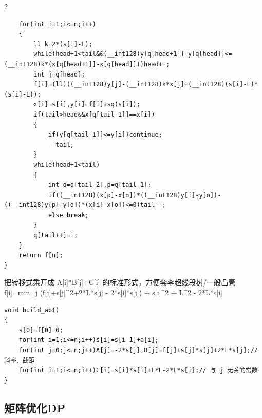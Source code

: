 \documentclass[UTF8,fontset=fandol,a4paper,twoside]{ctexart}
\newcommand{\note}[1]{{\fontsize{10}{12}\selectfont #1\par}}
\begin{document}
\begin{multicols}{2}
\begin{lstlisting}
    for(int i=1;i<=n;i++)
    {
        ll k=2*(s[i]-L);
        while(head+1<tail&&(__int128)y[q[head+1]]-y[q[head]]<=(__int128)k*(x[q[head+1]]-x[q[head]]))head++;
        int j=q[head];
        f[i]=(ll)((__int128)y[j]-(__int128)k*x[j]+(__int128)(s[i]-L)*(s[i]-L));
        x[i]=s[i],y[i]=f[i]+sq(s[i]);
        if(tail>head&&x[q[tail-1]]==x[i])
        {
            if(y[q[tail-1]]<=y[i])continue;
            --tail;
        }
        while(head+1<tail)
        {
            int o=q[tail-2],p=q[tail-1];
            if((__int128)(x[p]-x[o])*((__int128)y[i]-y[o])-((__int128)y[p]-y[o])*(x[i]-x[o])<=0)tail--;
            else break;
        }
        q[tail++]=i;
    }
    return f[n];
}
\end{lstlisting}
\note{把转移式乘开成 A[\allowbreak{}i]\allowbreak{}*B[\allowbreak{}j]\allowbreak{}+\allowbreak{}C[\allowbreak{}i]\allowbreak{} 的标准形式，方便套李超线段树/\allowbreak{}一般凸壳 f[\allowbreak{}i]\allowbreak{}=\allowbreak{}min\_j (\allowbreak{}f[\allowbreak{}j]\allowbreak{}+\allowbreak{}s[\allowbreak{}j]\allowbreak{}\textasciicircum{}2+\allowbreak{}2*L*s[\allowbreak{}j]\allowbreak{} -\allowbreak{} 2*s[\allowbreak{}i]\allowbreak{}*s[\allowbreak{}j]\allowbreak{})\allowbreak{} +\allowbreak{} s[\allowbreak{}i]\allowbreak{}\textasciicircum{}2 +\allowbreak{} L\textasciicircum{}2 -\allowbreak{} 2*L*s[\allowbreak{}i]\allowbreak{}}
\begin{lstlisting}
void build_ab()
{
    s[0]=f[0]=0;
    for(int i=1;i<=n;i++)s[i]=s[i-1]+a[i];
    for(int j=0;j<=n;j++)A[j]=-2*s[j],B[j]=f[j]+s[j]*s[j]+2*L*s[j];// 斜率、截距
    for(int i=1;i<=n;i++)C[i]=s[i]*s[i]+L*L-2*L*s[i];// 与 j 无关的常数
}
\end{lstlisting}
\subsection{矩阵优化DP}


\end{multicols}
\end{document}
